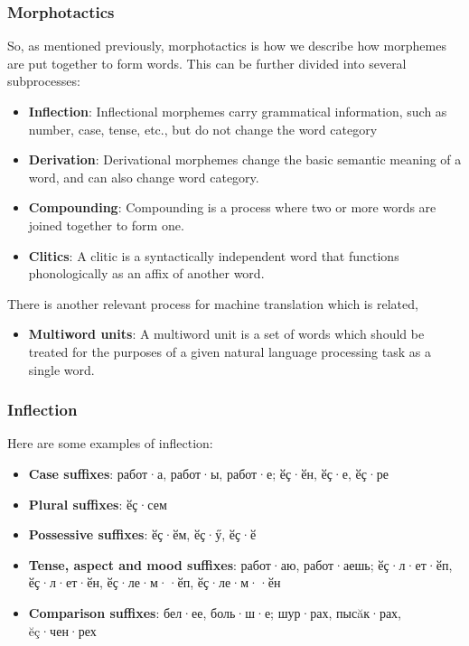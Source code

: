 \documentclass[10pt,xetex]{beamer} %
\begin{document}
\begin{frame}
  \frametitle{Morphotactics}

So, as mentioned previously, morphotactics is how we describe how morphemes
are put together to form words. This can be further divided into several
subprocesses:

\begin{itemize}
  \item {\bf Inflection}: Inflectional morphemes carry grammatical information, such as number, case, tense, etc., but do not change the word category
  \item {\bf Derivation}: Derivational morphemes change the basic semantic meaning of a word, and can also change word category.
  \item {\bf Compounding}: Compounding is a process where two or more words are joined together to form one.
  \item {\bf Clitics}: A clitic is a syntactically independent word that functions phonologically as an affix of another word.
\end{itemize}

There is another relevant process for machine translation which is related,

\begin{itemize}
  \item {\bf Multiword units}: A multiword unit is a set of words which should be treated for the purposes of a given natural language processing task as a single word.
\end{itemize}

\end{frame}

\begin{frame}
  \frametitle{Inflection}

Here are some examples of inflection:

\begin{itemize}
  \item {\bf Case suffixes}: работ·а, работ·ы, работ·е; ӗҫ·ӗн, ӗҫ·е, ӗҫ·ре
  \item {\bf Plural suffixes}: ӗҫ·сем
  \item {\bf Possessive suffixes}: ӗҫ·ӗм, ӗҫ·ӳ, ӗҫ·ӗ
  \item {\bf Tense, aspect and mood suffixes}: работ·аю, работ·аешь; ӗҫ·л·ет·ӗп, ӗҫ·л·ет·ӗн, ӗҫ·ле·м··ӗп, ӗҫ·ле·м··ӗн
  \item {\bf Comparison suffixes}: бел·ее, боль·ш·е; шур·рах, пысăк·рах, ĕç·чен·рех
\end{itemize}

\end{frame}
\end{document}
